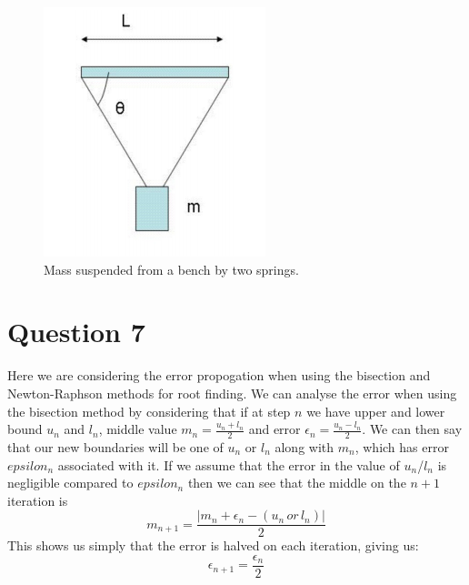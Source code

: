 \documentclass[a4paper,12pt]{UoBnote}
\begin{document}
\begin{figure}
	\centering
	\includegraphics[scale=1]{masses}
	\caption{Mass suspended from a bench by two springs.}
	\label{fig:masses}
\end{figure}

\section{Question 7}

Here we are considering the error propogation when using the bisection and Newton-Raphson methods for root finding. We can analyse the error when using the bisection method by considering that if at step $n$ we have upper and lower bound $u_n$ and $l_n$, middle value $m_n=\frac{u_n+l_n}{2}$ and error $\epsilon_n=\frac{u_n-l_n}{2}$. We can then say that our new boundaries will be one of $u_n$ or $l_n$ along with $m_n$, which has error $epsilon_n$ associated with it. If we assume that the error in the value of $u_n$/$l_n$ is negligible compared to $epsilon_n$ then we can see that the middle on the $n+1$ iteration is \[m_{n+1}=\frac{|m_n+\epsilon_n-(u_n\, or\, l_n)|}{2}\] This shows us simply that the error is halved on each iteration, giving us: \[\epsilon_{n+1}=\frac{\epsilon_n}{2}\]
\end{document}
